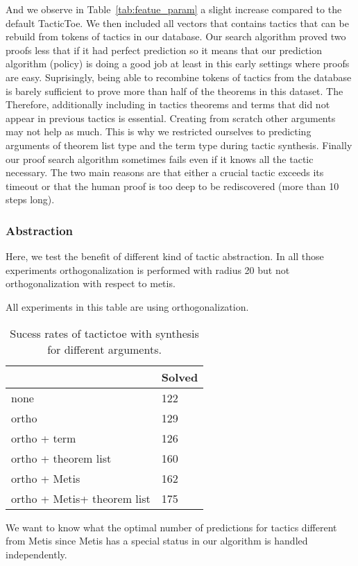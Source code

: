 \documentclass[runningheads,a4paper,draft]{svjour3}
\def\metis{\textsf{Metis}\xspace}
\def\tactictoe{\textsf{TacticToe}\xspace}
\newcommand{\ra}[1]{\renewcommand{\arraystretch}{#1}}
\begin{document}
And we observe in Table~\ref{tab:featue_param} a 
slight increase compared to the default \tactictoe. We then included all 
vectors that contains tactics that can be rebuild from tokens of
tactics in our database. 
Our search algorithm proved two proofs less that if it had perfect prediction 
so it means that our prediction algorithm (policy) is doing a good  job at 
least in this early settings where proofs are easy. 
Suprisingly, being able to recombine tokens of tactics from the database is 
barely sufficient to prove more than half of the theorems in this dataset. The 
Therefore, additionally including in tactics theorems and terms that did not 
appear in previous tactics is essential. Creating from scratch other arguments 
may not help as much. This is why we restricted ourselves to predicting 
arguments of theorem list type and the term type during tactic synthesis. 
Finally our proof search algorithm sometimes fails even if it knows all the 
tactic necessary. The two main reasons are that either a crucial tactic exceeds 
its timeout or that the human proof is too deep to be rediscovered (more than 
10 steps long).

\subsubsection{Abstraction}
Here, we test the benefit of different kind of tactic abstraction. 
In all those experiments orthogonalization is performed with radius 20 but not 
orthogonalization with respect to metis.


All experiments in this table are using orthogonalization.
\begin{table}[t]
\centering\ra{1.3}
\small
\begin{tabular}{ll}
\toprule
  & Solved \\
\midrule
 none & 122\\
 ortho & 129\\
 ortho + term & 126\\    
 ortho + theorem list & 160\\
 ortho + \metis & 162\\
 ortho + \metis + theorem list & 175\\ 
\bottomrule
\end{tabular}
\caption{\label{tab:cfot_param}
Sucess rates of tactictoe with synthesis for different arguments.}
\end{table}
We want to know what the optimal number of predictions for tactics different 
from \metis since \metis has a special status in our algorithm is handled 
independently.
\end{document}
